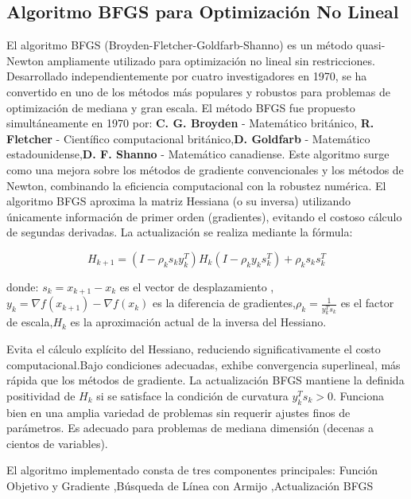 \documentclass{article}
\begin{document}
\subsection{Algoritmo BFGS para Optimización No Lineal}

El algoritmo BFGS (Broyden-Fletcher-Goldfarb-Shanno) es un método quasi-Newton ampliamente utilizado para optimización no lineal sin restricciones. Desarrollado independientemente por cuatro investigadores en 1970, se ha convertido en uno de los métodos más populares y robustos para problemas de optimización de mediana y gran escala.
El método BFGS fue propuesto simultáneamente en 1970 por:
\textbf{C. G. Broyden} - Matemático británico, \textbf{R. Fletcher} - Científico computacional británico,\textbf{D. Goldfarb} - Matemático estadounidense,\textbf{D. F. Shanno} - Matemático canadiense.
Este algoritmo surge como una mejora sobre los métodos de gradiente convencionales y los métodos de Newton, combinando la eficiencia computacional con la robustez numérica.
El algoritmo BFGS aproxima la matriz Hessiana (o su inversa) utilizando únicamente información de primer orden (gradientes), evitando el costoso cálculo de segundas derivadas. La actualización se realiza mediante la fórmula:

\begin{equation}
H_{k+1} = (I - \rho_k s_k y_k^T) H_k (I - \rho_k y_k s_k^T) + \rho_k s_k s_k^T
\end{equation}

donde:
 $s_k = x_{k+1} - x_k$ es el vector de desplazamiento ,
 $y_k = \nabla f(x_{k+1}) - \nabla f(x_k)$ es la diferencia de gradientes,$\rho_k = \frac{1}{y_k^T s_k}$ es el factor de escala,$H_k$ es la aproximación actual de la inversa del Hessiano.
 





Evita el cálculo explícito del Hessiano, reduciendo significativamente el costo computacional.Bajo condiciones adecuadas, exhibe convergencia superlineal, más rápida que los métodos de gradiente. La actualización BFGS mantiene la definida positividad de $H_k$ si se satisface la condición de curvatura $y_k^T s_k > 0$. Funciona bien en una amplia variedad de problemas sin requerir ajustes finos de parámetros. Es adecuado para problemas de mediana dimensión (decenas a cientos de variables).


El algoritmo implementado consta de tres componentes principales:
 Función Objetivo y Gradiente ,Búsqueda de Línea con Armijo ,Actualización BFGS
\end{document}
